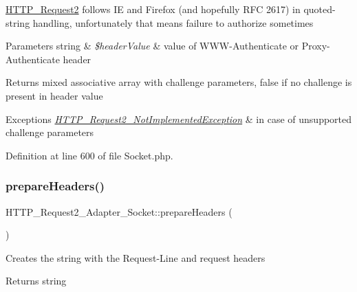 \hyperlink{classHTTP__Request2}{H\+T\+T\+P\+\_\+\+Request2} follows IE and Firefox (and hopefully R\+FC 2617) in quoted-\/string handling, unfortunately that means failure to authorize sometimes


\begin{DoxyParams}[1]{Parameters}
string & {\em \$header\+Value} & value of W\+W\+W-\/\+Authenticate or Proxy-\/\+Authenticate header\\
\hline
\end{DoxyParams}
\begin{DoxyReturn}{Returns}
mixed associative array with challenge parameters, false if no challenge is present in header value 
\end{DoxyReturn}

\begin{DoxyExceptions}{Exceptions}
{\em \hyperlink{classHTTP__Request2__NotImplementedException}{H\+T\+T\+P\+\_\+\+Request2\+\_\+\+Not\+Implemented\+Exception}} & in case of unsupported challenge parameters \\
\hline
\end{DoxyExceptions}


Definition at line 600 of file Socket.\+php.

\mbox{\label{classHTTP__Request2__Adapter__Socket_a8715074a6226005aa4db694a899c759b}} 
\subsubsection{\texorpdfstring{prepare\+Headers()}{prepareHeaders()}}
{\footnotesize\ttfamily H\+T\+T\+P\+\_\+\+Request2\+\_\+\+Adapter\+\_\+\+Socket\+::prepare\+Headers (\begin{DoxyParamCaption}{ }\end{DoxyParamCaption})\hspace{0.3cm}{\ttfamily [protected]}}

Creates the string with the Request-\/\+Line and request headers

\begin{DoxyReturn}{Returns}
string 
\end{DoxyReturn}

